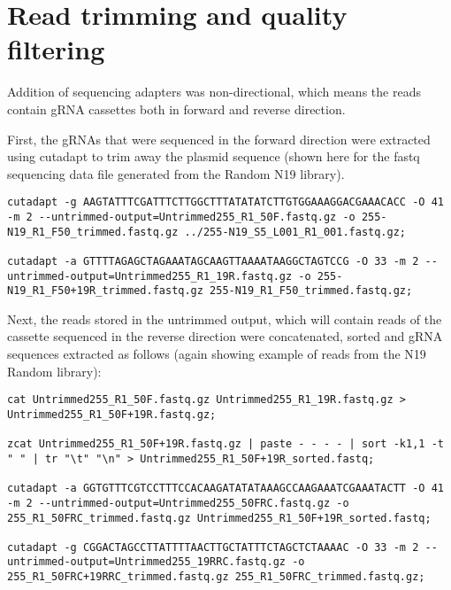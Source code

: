 \section{Read trimming and quality filtering}

Addition of sequencing adapters was non-directional, which means the reads contain gRNA cassettes both in forward and reverse direction.

First, the gRNAs that were sequenced in the forward direction were extracted using cutadapt \cite{Martin:2011va} to trim away the plasmid sequence (shown here for the fastq sequencing data file generated from the Random N19 library).

\begin{small}\begin{lstlisting}
cutadapt -g AAGTATTTCGATTTCTTGGCTTTATATATCTTGTGGAAAGGACGAAACACC -O 41 -m 2 --untrimmed-output=Untrimmed255_R1_50F.fastq.gz -o 255-N19_R1_F50_trimmed.fastq.gz ../255-N19_S5_L001_R1_001.fastq.gz;

cutadapt -a GTTTTAGAGCTAGAAATAGCAAGTTAAAATAAGGCTAGTCCG -O 33 -m 2 --untrimmed-output=Untrimmed255_R1_19R.fastq.gz -o 255-N19_R1_F50+19R_trimmed.fastq.gz 255-N19_R1_F50_trimmed.fastq.gz;
\end{lstlisting}\end{small}

Next, the reads stored in the untrimmed output, which will contain reads of the cassette sequenced in the reverse direction were concatenated, sorted and gRNA sequences extracted as follows (again showing example of reads from the N19 Random library):

\begin{small}\begin{lstlisting}
cat Untrimmed255_R1_50F.fastq.gz Untrimmed255_R1_19R.fastq.gz > Untrimmed255_R1_50F+19R.fastq.gz;

zcat Untrimmed255_R1_50F+19R.fastq.gz | paste - - - - | sort -k1,1 -t " " | tr "\t" "\n" > Untrimmed255_R1_50F+19R_sorted.fastq;

cutadapt -a GGTGTTTCGTCCTTTCCACAAGATATATAAAGCCAAGAAATCGAAATACTT -O 41 -m 2 --untrimmed-output=Untrimmed255_50FRC.fastq.gz -o 255_R1_50FRC_trimmed.fastq.gz Untrimmed255_R1_50F+19R_sorted.fastq;

cutadapt -g CGGACTAGCCTTATTTTAACTTGCTATTTCTAGCTCTAAAAC -O 33 -m 2 --untrimmed-output=Untrimmed255_19RRC.fastq.gz -o 255_R1_50FRC+19RRC_trimmed.fastq.gz 255_R1_50FRC_trimmed.fastq.gz;
\end{lstlisting}\end{small}

